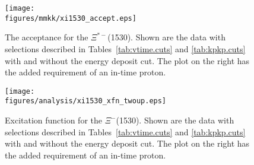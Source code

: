\begin{figure}[bhpt]\centering
    \texttt{[image: \\figures/mmkk/xi1530\_accept.eps]}
    \caption[\texorpdfstring{$\Xi^{*-}$}{Xi*-}(1530) Acceptance]{\label{fig:xi1530.accept}The acceptance for the $\Xi^{*-}$(1530). Shown are the data with selections described in Tables~\ref{tab:vtime.cuts} and \ref{tab:kpkp.cuts} with and without the  energy deposit cut. The plot on the right has the added requirement of an in-time proton.}
\end{figure}

\begin{figure}[bhpt]\begin{center}
    \texttt{[image: \\figures/analysis/xi1530\_xfn\_twoup.eps]}
    \caption[$\Xi^-$(1530) Excitation Function]{\label{fig:xim1530.xfn}Excitation function for the $\Xi^-$(1530). Shown are the data with selections described in Tables~\ref{tab:vtime.cuts} and \ref{tab:kpkp.cuts} with and without the  energy deposit cut. The plot on the right has the added requirement of an in-time proton.}
\end{center}\end{figure}

\clearpage
